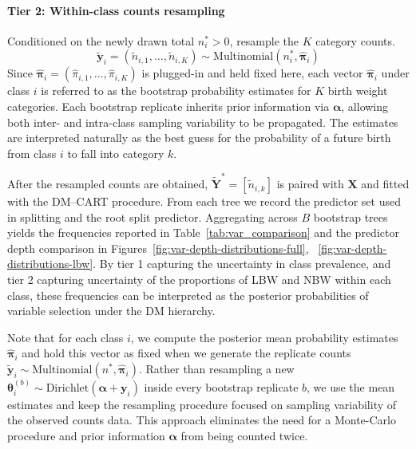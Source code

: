 \paragraph{Tier 2: Within-class counts resampling}
\label{para:tier-2}
Conditioned on the newly drawn total \(n_i^\ast > 0\), resample the \(K\) category counts. 
\begin{equation}
    \label{eq:stage2}
        \tilde{\mathbf{y}}_i = (\tilde{n}_{i,1}, \dots, \tilde{n}_{i,K}) \sim \mathrm{Multinomial}(n_i^\ast, \hat{\boldsymbol{\pi}}_i)
\end{equation}
Since \(\boldsymbol{\hat{\pi}}_i = (\hat{\pi}_{i,1}, \dots,\hat{\pi}_{i,K})\) is plugged-in and held fixed here, each vector \(\hat{\boldsymbol{\pi}}_i\) under class \(i\) is referred to as the bootstrap probability estimates for \(K\) birth weight categories. Each bootstrap replicate inherits prior information via \(\boldsymbol{\alpha}\), allowing both inter- and intra-class sampling variability to be propagated. The estimates are interpreted naturally as the best guess for the probability of a future birth from class \(i\) to fall into category \(k\). 

After the resampled counts are obtained, \(\tilde{\mathbf Y}^{\ast}=[\tilde n_{i,k}]\) is paired with \(\mathbf{X}\) and fitted with the DM–CART procedure.  From each tree we record the predictor set used in splitting and the root split predictor. Aggregating across \(B\) bootstrap trees yields the frequencies reported in Table~\ref{tab:var_comparison} and the predictor depth comparison in Figures~\ref{fig:var-depth-distributions-full}, ~\ref{fig:var-depth-distributions-lbw}. By tier 1 capturing the uncertainty in class prevalence, and tier 2 capturing uncertainty of the proportions of LBW and NBW within each class, these frequencies can be interpreted as the posterior probabilities of variable selection under the DM hierarchy. 

Note that for each class \(i\), we compute the posterior mean probability estimates \(\hat{\boldsymbol{\pi}}_i\) and hold this vector as fixed when we generate the replicate counts \(\tilde{\mathbf{y}}_i \sim \mathrm{Multinomial}(n^\ast,\hat{\boldsymbol{\pi}}_i)\). Rather than resampling a new \(\boldsymbol{\theta}_i^{(b)} \sim \mathrm{Dirichlet}(\boldsymbol{\alpha} + \mathbf{y}_i)\) inside every bootstrap replicate \(b\), we use the mean estimates and keep the resampling procedure focused on sampling variability of the observed counts data. This approach eliminates the need for a Monte-Carlo procedure and prior information \(\boldsymbol{\alpha}\) from being counted twice.

